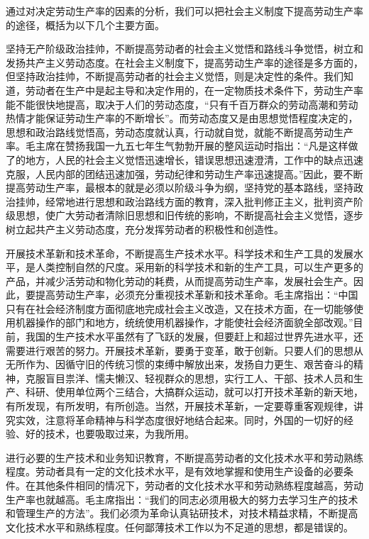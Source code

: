 \documentclass{book}
\begin{document}
通过对决定劳动生产率的因素的分析，我们可以把社会主义制度下提高劳动生产率的途径，概括为以下几个主要方面。

坚持无产阶级政治挂帅，不断提高劳动者的社会主义觉悟和路线斗争觉悟，树立和发扬共产主义劳动态度。在社会主义制度下，提高劳动生产率的途径是多方面的，但坚持政治挂帅，不断提高劳动者的社会主义觉悟，则是决定性的条件。我们知道，劳动者在生产中是起主导和决定作用的，在一定物质技术条件下，劳动生产率能不能很快地提高，取决于人们的劳动态度，“只有千百万群众的劳动高潮和劳动热情才能保证劳动生产率的不断增长”。而劳动态度又是由思想觉悟程度决定的，思想和政治路线觉悟高，劳动态度就认真，行动就自觉，就能不断提高劳动生产率。毛主席在赞扬我国一九五七年生气勃勃开展的整风运动时指出：“凡是这样做了的地方，人民的社会主义觉悟迅速增长，错误思想迅速澄清，工作中的缺点迅速克服，人民内部的团结迅速加强，劳动纪律和劳动生产率迅速提高。”因此，要不断提高劳动生产率，最根本的就是必须以阶级斗争为纲，坚持党的基本路线，坚持政治挂帅，经常地进行思想和政治路线方面的教育，深入批判修正主义，批判资产阶级思想，使广大劳动者清除旧思想和旧传统的影响，不断提高社会主义觉悟，逐步树立起共产主义劳动态度，充分发挥劳动者的积极性和创造性。

开展技术革新和技术革命，不断提高生产技术水平。科学技术和生产工具的发展水平，是人类控制自然的尺度。采用新的科学技术和新的生产工具，可以生产更多的产品，并减少活劳动和物化劳动的耗费，从而提高劳动生产率，发展社会生产。因此，要提高劳动生产率，必须充分重视技术革新和技术革命。毛主席指出：“中国只有在社会经济制度方面彻底地完成社会主义改造，又在技术方面，在一切能够使用机器操作的部门和地方，统统使用机器操作，才能使社会经济面貌全部改观。”目前，我国的生产技术水平虽然有了飞跃的发展，但要赶上和超过世界先进水平，还需要进行艰苦的努力。开展技术革新，要勇于变革，敢于创新。只要人们的思想从无所作为、因循守旧的传统习惯的束缚中解放出来，发扬自力更生、艰苦奋斗的精神，克服盲目祟洋、懦夫懒汉、轻视群众的思想，实行工人、干部、技术人员和生产、科研、使用单位两个三结合，大搞群众运动，就可以打开技术革新的新天地，有所发现，有所发明，有所创造。当然，开展技术革新，一定要尊重客观规律，讲究实效，注意将革命精神与科学态度很好地结合起来。同时，外国的一切好的经验、好的技术，也要吸取过来，为我所用。

进行必要的生产技术和业务知识教育，不断提高劳动者的文化技术水平和劳动熟练程度。劳动者具有一定的文化技术水平，是有效地掌握和使用生产设备的必要条件。在其他条件相同的情况下，劳动者的文化技术水平和劳动熟练程度越高，劳动生产率也就越高。毛主席指出：“我们的同志必须用极大的努力去学习生产的技术和管理生产的方法”。我们必须为革命认真钻研技术，对技术精益求精，不断提高文化技术水平和熟练程度。任何鄙薄技术工作以为不足道的思想，都是错误的。
\end{document}
